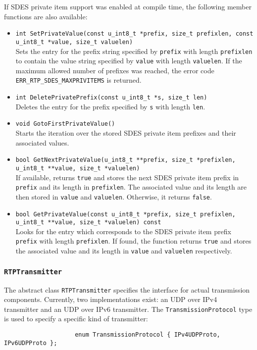 \documentclass[12pt,a4paper]{article}
\newcommand{\headerfile}[1]{\marginpar{\scriptsize Header:\\{\tt #1}}}
\begin{document}
				If SDES private item support was enabled at compile time, the following
				member functions are also available:
				\begin{itemize}
					\item {\tt int SetPrivateValue(const u\_int8\_t *prefix, size\_t prefixlen, const u\_int8\_t *value, size\_t valuelen)}\\
						Sets the entry for the prefix string specified by {\tt prefix} with
						length {\tt prefixlen} to contain the value string specified by
						{\tt value} with length {\tt valuelen}. If the maximum allowed
						number of prefixes was reached, the error code
						{\tt ERR\_\-RTP\_\-SDES\_\-MAX\-PRIV\-ITEMS} is returned.
					\item {\tt int DeletePrivatePrefix(const u\_int8\_t *s, size\_t len)}\\
						Deletes the entry for the prefix specified by {\tt s} with length
						{\tt len}.
					\item {\tt void GotoFirstPrivateValue()}\\
						Starts the iteration over the stored SDES private item prefixes
						and their associated values.
					\item {\tt bool GetNextPrivateValue(u\_int8\_t **prefix, size\_t *prefixlen, u\_int8\_t **value, size\_t *valuelen)}\\
						If available, returns {\tt true} and stores the next SDES
						private item prefix in {\tt prefix} and its length in
						{\tt prefixlen}. The associated value and its length are
						then stored in {\tt value} and {\tt valuelen}. Otherwise,
						it returns {\tt false}.
					\item {\tt bool GetPrivateValue(const u\_int8\_t *prefix, size\_t prefixlen, u\_int8\_t **value, size\_t *valuelen) const}\\ 
						Looks for the entry which corresponds to the SDES private
						item prefix {\tt prefix} with length {\tt prefixlen}. If found,
						the function returns {\tt true} and stores the associated
						value and its length in {\tt value} and {\tt valuelen}
						respectively.
					\end{itemize}

            \subsubsection{\tt RTPTransmitter}\headerfile{rtptransmitter.h}

				The abstract class {\tt RTPTransmitter} specifies the interface for
				actual transmission components. Currently, two implementations exist:
				an UDP over IPv4 transmitter and an UDP over IPv6 transmitter. The
				{\tt TransmissionProtocol} type is used to specify a specific kind
				of transmitter:
				\begin{verbatim}
					enum TransmissionProtocol { IPv4UDPProto, IPv6UDPProto };
				\end{verbatim}
\end{document}
